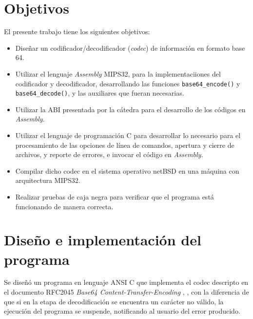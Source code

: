 \section{Objetivos}
El presente trabajo tiene los siguientes objetivos:
\begin{itemize}
    \item Diseñar un codificador/decodificador (\emph{codec}) de información en formato base 64.
    \item Utilizar el lenguaje \textit{Assembly} MIPS32, para la implementaciiones del codificador y decodificador, desarrollando las funciones \texttt{base64\_encode()} y \texttt{base64\_decode()}, y las auxiliares que fueran necesarias.
    \item Utilizar la ABI presentada por la cátedra para el desarrollo de los códigos en \textit{Assembly}.
    \item Utilizar el lenguaje de programación C para desarrollar lo necesario para el procesamiento de las opciones de línea de comandos, apertura y cierre de archivos, y reporte de errores, e invocar el código en \textit{Assembly}.
    \item Compilar dicho codec en el sistema operativo netBSD en una máquina con arquitectura MIPS32.
    \item Realizar pruebas de caja negra para verificar que el programa está funcionando de manera correcta.
\end{itemize}
\section{Diseño e implementación del programa}

Se diseñó un programa en lenguaje ANSI C que implementa el codec descripto en el documento RFC2045 \emph{Base64 Content-Transfer-Encoding} \cite{rfc2045}, \cite{wiki_base64}, con la diferencia de que si en la etapa de decodificación se encuentra un carácter no válido, la ejecución del programa se suspende, notificando al usuario del error producido.

